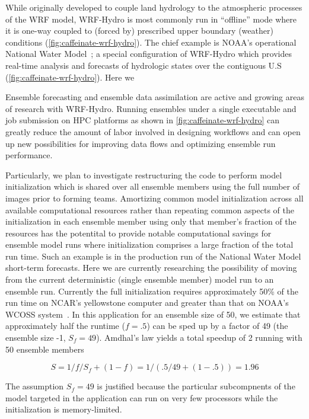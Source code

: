 While originally developed to couple land hydrology to the atmospheric processes of
the WRF model, WRF-Hydro is most commonly run in ``offline'' mode where it is one-way
coupled to (forced by) prescribed upper boundary (weather)
conditions (\ref{fig:caffeinate-wrf-hydro}). The chief example is NOAA's operational
National Water Model~\cite{noaa2016}; a special configuration of
WRF-Hydro which provides real-time analysis and forecasts of
hydrologic states over the contiguous U.S (\ref{fig:caffeinate-wrf-hydro}). Here we

Ensemble forecasting and ensemble data assimilation are active and
growing areas of research with WRF-Hydro. Running ensembles under a
single executable and job submission on HPC platforms as shown in
\ref{fig:caffeinate-wrf-hydro} can greatly reduce the amount
of labor involved in designing workflows and can open up new
possibilities for improving data flows and optimizing ensemble run
performance.

Particularly, we plan to investigate restructuring the code to perform
model initialization which is shared over all ensemble members using
the full number of images prior to forming teams. Amortizing common
model initialization across all available computational resources
rather than repeating common aspects of the initialization in each
ensemble member using only that member's fraction of the resources has
the potentital to provide notable computational savings for
ensemble model runs where initialization comprises a large fraction of
the total run time. Such an example is in the production run of the
National Water Model short-term forecasts. Here we are currently
researching the possibility of moving from the current deterministic
(single ensemble member) model run to an ensemble run. Currently the
full initialization requires approximately 50\% of the run time on
NCAR's yellowstone computer and greater than that on NOAA's WCOSS
system~\cite{yuetal2017}. In this application for an ensemble size of 50, we estimate that
approximately half the runtime ($f=.5$) can be sped up by a factor of
49 (the ensemble size -1, $S_f=49$). Amdhal's law yields a total speedup
of 2 running with 50 ensemble members

\begin{equation}
S = 1 / { f/S_f + (1-f) } = 1 / (.5/49 + (1-.5)) = 1.96
\end{equation}

The assumption $S_f=49$ is justified because the particular subcompnents of
the model targeted in the application can run on very few processors while the
initialization is memory-limited.

